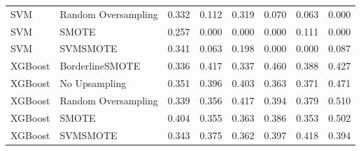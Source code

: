 \begin{tabular}{llllllll}
                         SVM & Random Oversampling & 0.332 &                     0.112 &                 0.319 &                  0.070 &                                   0.063 &    0.000 \\
                         SVM &               SMOTE & 0.257 &                     0.000 &                 0.000 &                  0.000 &                                   0.111 &    0.000 \\
                         SVM &            SVMSMOTE & 0.341 &                     0.063 &                 0.198 &                  0.000 &                                   0.000 &    0.087 \\
                     XGBoost &     BorderlineSMOTE & 0.336 &                     0.417 &                 0.337 &                  0.460 &                                   0.388 &    0.427 \\
                     XGBoost &       No Upsampling & 0.351 &                     0.396 &                 0.403 &                  0.363 &                                   0.371 &    0.471 \\
                     XGBoost & Random Oversampling & 0.339 &                     0.356 &                 0.417 &                  0.394 &                                   0.379 &    0.510 \\
                     XGBoost &               SMOTE & 0.404 &                     0.355 &                 0.363 &                  0.386 &                                   0.353 &    0.502 \\
                     XGBoost &            SVMSMOTE & 0.343 &                     0.375 &                 0.362 &                  0.397 &                                   0.418 &    0.394 \\
\bottomrule
\end{tabular}
